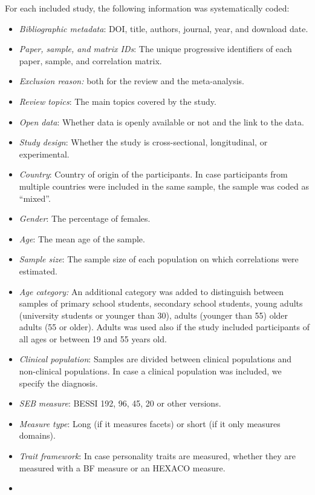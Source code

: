 \documentclass[
  man,
  longtable,
  nolmodern,
  notxfonts,
  notimes,
  colorlinks=true,linkcolor=blue,citecolor=blue,urlcolor=blue]{apa7}
\begin{document}
For each included study, the following information was systematically
coded:

\begin{itemize}
\item
  \emph{Bibliographic metadata}: DOI, title, authors, journal, year, and
  download date.
\item
  \emph{Paper, sample, and matrix IDs}: The unique progressive
  identifiers of each paper, sample, and correlation matrix.
\item
  \emph{Exclusion reason:} both for the review and the meta-analysis.
\item
  \emph{Review topics}: The main topics covered by the study.
\item
  \emph{Open data}: Whether data is openly available or not and the link
  to the data.
\item
  \emph{Study design}: Whether the study is cross-sectional,
  longitudinal, or experimental.
\item
  \emph{Country}: Country of origin of the participants. In case
  participants from multiple countries were included in the same sample,
  the sample was coded as ``mixed''.
\item
  \emph{Gender}: The percentage of females.
\item
  \emph{Age}: The mean age of the sample.
\item
  \emph{Sample size}: The sample size of each population on which
  correlations were estimated.
\item
  \emph{Age category:} An additional category was added to distinguish
  between samples of primary school students, secondary school students,
  young adults (university students or younger than 30), adults (younger
  than 55) older adults (55 or older). Adults was used also if the study
  included participants of all ages or between 19 and 55 years old.
\item
  \emph{Clinical population}: Samples are divided between clinical
  populations and non-clinical populations. In case a clinical
  population was included, we specify the diagnosis.
\item
  \emph{SEB} \emph{measure}: BESSI 192, 96, 45, 20 or other versions.
\item
  \emph{Measure type}: Long (if it measures facets) or short (if it only
  measures domains).
\item
  \emph{Trait framework}: In case personality traits are measured,
  whether they are measured with a BF measure or an HEXACO measure.
\item

\end{itemize}
\end{document}

